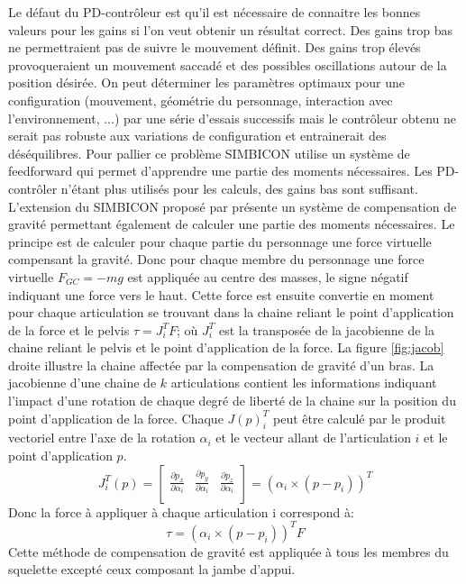 \documentclass[runningheads,a4paper]{llncs}
\begin{document}
Le défaut du PD-contrôleur est qu'il est nécessaire de connaitre les bonnes valeurs pour les gains si l'on veut obtenir un résultat correct. Des gains trop bas ne permettraient pas de suivre le mouvement définit. Des gains trop élevés provoqueraient un mouvement saccadé et des possibles oscillations autour de la position désirée. On peut déterminer les paramètres optimaux pour une configuration (mouvement, géométrie du personnage, interaction avec l'environnement, ...) par une série d'essais successifs mais le contrôleur obtenu ne serait pas robuste aux variations de configuration et entrainerait des déséquilibres. Pour pallier ce problème SIMBICON utilise un système de feedforward \cite{yin2007simbicon} qui permet d'apprendre une partie des moments nécessaires. Les PD-contrôler n'étant plus utilisés pour les calculs, des gains bas sont suffisant. 
L'extension du SIMBICON proposé par \cite{coros2010generalized} présente un système de compensation de gravité permettant également de calculer une partie des moments nécessaires. Le principe est de calculer pour chaque partie du personnage une force virtuelle compensant la gravité. Donc pour chaque membre du personnage une force virtuelle \(F_{GC}=-mg\) est appliquée au centre des masses, le signe négatif indiquant une force vers le haut. Cette force est ensuite convertie en moment pour chaque articulation se trouvant dans la chaine reliant le point d'application de la force et le pelvis \(\tau=J_i^T F\); où \(J_i ^T\) est la transposée de la jacobienne de la chaine reliant le pelvis et le point d'application de la force. La figure \ref{fig:jacob} droite illustre la chaine affectée par la compensation de gravité d'un bras.
La jacobienne d'une chaine de \(k\) articulations contient les informations indiquant l'impact d'une rotation de chaque degré de liberté de la chaine sur la position du point d'application de la force. Chaque $J(p)_i ^T$ peut être calculé par le produit vectoriel entre l'axe de la rotation $\alpha_i$ et le vecteur allant de l'articulation \(i\) et le point d'application $p$.
\[
J_i ^T (p)=\begin{bmatrix}
\frac{\partial p_x}{\partial \alpha_i} & \frac{\partial p_y}{\partial \alpha_i} & \frac{\partial p_z}{\partial \alpha_i} \\
\end{bmatrix}
= (\alpha_i \times (p-p_i))^T
\]
Donc la force à appliquer à chaque articulation i correspond à:
\[
\tau = (\alpha_i \times (p-p_i))^T F
\]
Cette méthode de compensation de gravité est appliquée à tous les membres du squelette excepté ceux composant la jambe d'appui.
\end{document}
